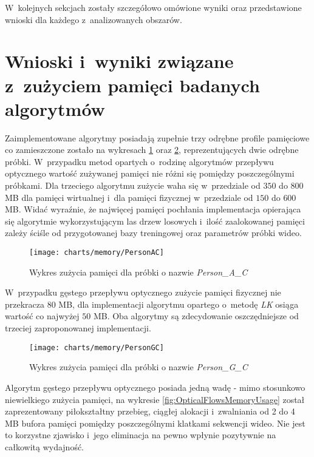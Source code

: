     W~kolejnych sekcjach zostały szczegółowo omówione wyniki oraz przedstawione wnioski dla każdego z~analizowanych obszarów.

  \section{Wnioski i~wyniki związane z~zużyciem pamięci badanych algorytmów}\label{Section_Memory}

    Zaimplementowane algorytmy posiadają zupełnie trzy odrębne profile pamięciowe co zamieszczone zostało na wykresach \ref{fig:MemoryUsagePersonAC} oraz \ref{fig:MemoryUsagePersonGC}, reprezentujących dwie odrębne próbki. W~przypadku metod opartych o~rodzinę algorytmów przepływu optycznego wartość zużywanej pamięci nie różni się pomiędzy poszczególnymi próbkami. Dla trzeciego algorytmu zużycie waha się w~przedziale od $350$ do $800$ MB dla pamięci wirtualnej i~dla pamięci fizycznej w~przedziale od $150$ do $600$ MB. Widać wyraźnie, że najwięcej pamięci pochłania implementacja opierająca się algorytmie wykorzystującym las drzew losowych i~ilość zaalokowanej pamięci zależy ściśle od przygotowanej bazy treningowej oraz parametrów próbki wideo.

    \begin{figure}[!ht]
      \centering
      \texttt{[image: charts/memory/PersonAC]}
      \caption[Wykres zużycia pamięci dla próbki o nazwie Person\_A\_C]
              {Wykres zużycia pamięci dla próbki o nazwie \textit{Person\_A\_C}}
      \label{fig:MemoryUsagePersonAC}
    \end{figure}

    W~przypadku gęstego przepływu optycznego zużycie pamięci fizycznej nie przekracza $80$ MB, dla implementacji algorytmu opartego o~metodę \textit{LK} osiąga wartość co najwyżej $50$ MB. Oba algorytmy są zdecydowanie oszczędniejsze od trzeciej zaproponowanej implementacji.

    \begin{figure}[!ht]
      \centering
      \texttt{[image: charts/memory/PersonGC]}
      \caption[Wykres zużycia pamięci dla próbki o nazwie Person\_G\_C]
              {Wykres zużycia pamięci dla próbki o nazwie \textit{Person\_G\_C}}
      \label{fig:MemoryUsagePersonGC}
    \end{figure}

    Algorytm gęstego przepływu optycznego posiada jedną wadę - mimo stosunkowo niewielkiego zużycia pamięci, na wykresie \ref{fig:OpticalFlowsMemoryUsage} został zaprezentowany piłokształtny przebieg, ciągłej alokacji i~zwalniania od 2 do 4 MB bufora pamięci pomiędzy poszczególnymi klatkami sekwencji wideo. Nie jest to korzystne zjawisko i~jego eliminacja na pewno wpłynie pozytywnie na całkowitą wydajność.

